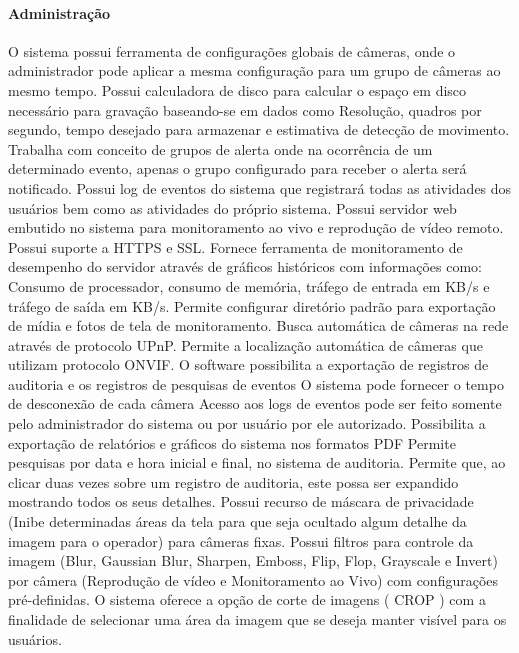     \paragraph{Administração}
    \bullet  O sistema possui ferramenta de configurações globais de câmeras, onde o administrador pode aplicar a mesma configuração para um grupo de câmeras ao mesmo tempo.
    \bullet Possui calculadora de disco para calcular o espaço em disco necessário para gravação baseando-se em dados como Resolução, quadros por segundo, tempo desejado para armazenar e estimativa de detecção de movimento.
    \bullet Trabalha com conceito de grupos de alerta onde na ocorrência de um determinado evento, apenas o grupo configurado para receber o alerta será notificado.
    \bullet Possui log de eventos do sistema que registrará todas as atividades dos usuários bem como as atividades do próprio sistema.
    \bullet Possui servidor web embutido no sistema para monitoramento ao vivo e reprodução de vídeo remoto.
    \bullet  Possui suporte a HTTPS e SSL.
    \bullet Fornece ferramenta de monitoramento de desempenho do servidor através de gráficos históricos com informações como: Consumo de processador, consumo de memória, tráfego de entrada em KB/s e tráfego de saída em KB/s.
    \bullet Permite configurar diretório padrão para exportação de mídia e fotos de tela de monitoramento.
    \bullet Busca automática de câmeras na rede através de protocolo UPnP.
    \bullet Permite a localização automática de câmeras que utilizam protocolo ONVIF.
    \bullet O software possibilita a exportação de registros de auditoria e os registros de pesquisas de eventos
    \bullet O sistema pode fornecer o tempo de desconexão de cada câmera
    \bullet Acesso aos logs de eventos pode ser feito somente pelo administrador do sistema ou por usuário por ele autorizado.
    \bullet Possibilita a exportação de relatórios e gráficos do sistema nos formatos PDF
    \bullet Permite pesquisas por data e hora inicial e final, no sistema de auditoria.
    \bullet  Permite que, ao clicar duas vezes sobre um registro de auditoria, este possa ser expandido mostrando todos os seus detalhes.
    \bullet Possui recurso de máscara de privacidade (Inibe determinadas áreas da tela para que seja ocultado algum detalhe da imagem para o operador) para câmeras fixas.
    \bullet Possui filtros para controle da imagem (Blur, Gaussian Blur, Sharpen, Emboss, Flip, Flop, Grayscale e Invert) por câmera (Reprodução de vídeo e Monitoramento ao Vivo) com configurações pré-definidas.
    \bullet O sistema oferece a opção de corte de imagens ( CROP ) com a finalidade de selecionar uma área da imagem que se deseja manter visível para os usuários.
    
